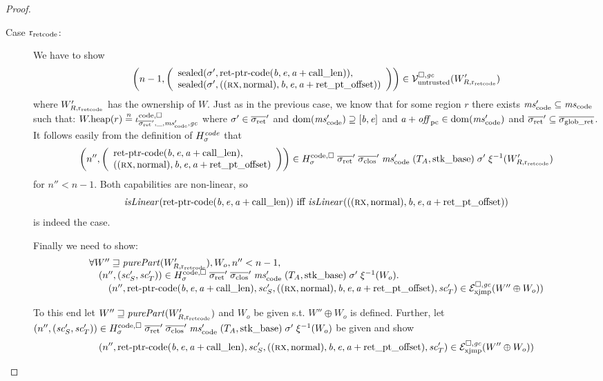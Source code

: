 \begin{proof}
\begin{description}
  \item[Case $\rretc$:]
    We have to show
    \[
      \npair[n-1]{\left(\array{l}\sealed{\sigma',\retptrc(\baddr,\eaddr,\aaddr +
            \calllen)},\\\sealed{\sigma',((\rx,\normal),\baddr,\eaddr,\aaddr + \retoffset)}\endarray\right)} \in \lrv(W_{R,\rretc}')
    \]
    where $W_{R,\rretc}'$ has the ownership of $W$.
    Just as in the previous case, we know that for some region $r$ there exists $\mscode' \subseteq \mscode$ such that: $\pwheap(r) \nequal \codereg{\sigrets',\_,\mscode',\gc}$ where $\sigma' \in \sigrets'$ and $\dom(\mscode') \supseteq [\baddr,\eaddr]$ and $\aaddr + \offpc \in \dom(\mscode')$ and $\sigrets' \subseteq \gsigrets$.
    It follows easily from the definition of $H_\sigma^\var{code}$ that
    \begin{equation}
      \label{eq:code-caps-in-h-sigma}
      \npair[n'']{\left(\array{l}\retptrc(\baddr,\eaddr,\aaddr + \calllen),\\((\rx,\normal),\baddr,\eaddr,\aaddr + \retoffset)\endarray\right)} \in H^\mathrm{code,\square}_\sigma \; \sigrets' \; \sigcloss' \; \mscode' \; (\ta,\stkb) \; \sigma' \; \xi^{-1}(W_{R,\rretc}')
    \end{equation}
    for $n'' < n-1$.
    Both capabilities are non-linear, so
    \[
      \isLinear{\retptrc(\baddr,\eaddr,\aaddr + \calllen)}\text{ iff } \isLinear{((\rx,\normal),\baddr,\eaddr,\aaddr + \retoffset)}
    \]
    is indeed the case.

    Finally we need to show:
    \[
      \begin{array}{l}
        \forall W'' \future \purePart{W_{R,\rretc}'}, W_o, n'' < n-1,\\
        \quad  \npair[n'']{(\vsc_S',\vsc'_T)} \in H^\mathrm{code,\square}_\sigma \; \sigrets' \; \sigcloss' \; \mscode' \; (\ta,\stkb) \; \sigma' \; \xi^{-1}(W_o) \ldotp \\
        \qquad \npair[n'']{\retptrc(\baddr,\eaddr,\aaddr + \calllen),\vsc_S',((\rx,\normal),\baddr,\eaddr,\aaddr + \retoffset),\vsc_T'} \in \lrexj(W''\oplus W_o))
      \end{array}
    \]

    To this end let $W'' \future \purePart{W_{R,\rretc}'}$ and $W_o$ be given s.t. $W'' \oplus W_o$ is defined.
    Further, let $\npair[n'']{(\vsc_S',\vsc'_T)} \in H^\mathrm{code,\square}_\sigma \; \sigrets' \; \sigcloss' \; \mscode' \; (\ta,\stkb) \; \sigma' \; \xi^{-1}(W_o)$ be given and show
    \[
      \npair[n'']{\retptrc(\baddr,\eaddr,\aaddr + \calllen),\vsc_S',((\rx,\normal),\baddr,\eaddr,\aaddr + \retoffset),\vsc_T'} \in \lrexj(W''\oplus W_o))
    \]


\end{description}
\end{proof}
